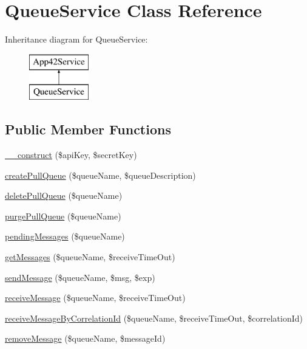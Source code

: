 \hypertarget{class_queue_service}{\section{Queue\+Service Class Reference}
\label{class_queue_service}
}
Inheritance diagram for Queue\+Service\+:\begin{figure}[H]
\begin{center}
\leavevmode
\includegraphics[height=2.000000cm]{class_queue_service}
\end{center}
\end{figure}
\subsection*{Public Member Functions}
\begin{DoxyCompactItemize}
\item 
\hyperlink{class_queue_service_a49f2ad222e06420736d750e167d55d7c}{\+\_\+\+\_\+construct} (\$api\+Key, \$secret\+Key)
\item 
\hyperlink{class_queue_service_ab72f0864a3d82cc3088d880de2435791}{create\+Pull\+Queue} (\$queue\+Name, \$queue\+Description)
\item 
\hyperlink{class_queue_service_a6888017f56f2be2e0b67dfb1427487fa}{delete\+Pull\+Queue} (\$queue\+Name)
\item 
\hyperlink{class_queue_service_a19dd1c9597dc35e1cc0bddb668c18f2f}{purge\+Pull\+Queue} (\$queue\+Name)
\item 
\hyperlink{class_queue_service_ab7cf5b2edb463d455ad2ea6ff6bf256e}{pending\+Messages} (\$queue\+Name)
\item 
\hyperlink{class_queue_service_a2306a286f86b3cebc4b7fc87be4b6765}{get\+Messages} (\$queue\+Name, \$receive\+Time\+Out)
\item 
\hyperlink{class_queue_service_a4249e96778bc83dec7297d4b70b4be5b}{send\+Message} (\$queue\+Name, \$msg, \$exp)
\item 
\hyperlink{class_queue_service_a32a08fa2c1ed1f2f17f55056369836fa}{receive\+Message} (\$queue\+Name, \$receive\+Time\+Out)
\item 
\hyperlink{class_queue_service_a533ce1d13f81991e3cae4e6413dff74c}{receive\+Message\+By\+Correlation\+Id} (\$queue\+Name, \$receive\+Time\+Out, \$correlation\+Id)
\item 
\hyperlink{class_queue_service_a4840c18a4c1a3f4cc4a0f7954a319a52}{remove\+Message} (\$queue\+Name, \$message\+Id)
\end{DoxyCompactItemize}
